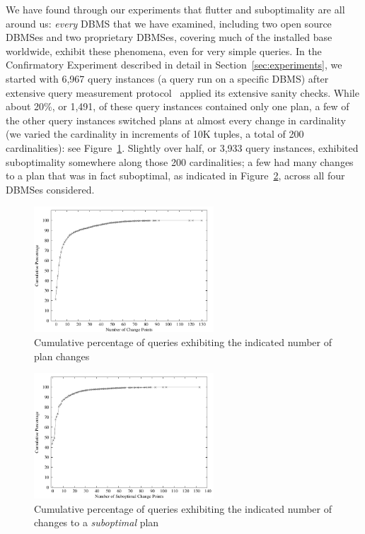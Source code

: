 \documentclass[prodmode,acmtods]{acmsmall}
\begin{document}
We have found through our experiments that flutter and suboptimality are all
around us: {\em every} \hbox{DBMS} that we have examined, including two
open source \hbox{DBMSes} and two proprietary
\hbox{DBMSes}, covering much of the installed base worldwide, exhibit these
phenomena, even for very simple queries. In the Confirmatory
Experiment described in detail in Section~\ref{sec:experiments}, we started
with 6,967 query instances (a query run on a specific \hbox{DBMS}) after  extensive query measurement
protocol~\cite{TTPv1,TTPv2} applied its extensive sanity checks. While about
20\%, or 1,491, of these query instances contained only one
plan, a few of the other query instances switched plans at almost every change in cardinality (we varied the
cardinality in increments of 10K tuples, a total of 200 cardinalities): see
Figure~\ref{fig:planchanges}. Slightly over half, or 3,933 query instances, exhibited
suboptimality somewhere along those 200 cardinalities; a few had
many changes to a plan that was in fact suboptimal, as indicated in
Figure~\ref{fig:suboptplanchanges}, across all four \hbox{DBMSes} considered.

\begin{figure}[t]\centering
\includegraphics[width=0.60\textwidth]{figures/org_ncpq.pdf}
\caption{Cumulative percentage of queries \hbox{exhibiting} the \hbox{indicated}
  number of plan changes\label{fig:planchanges}}
\end{figure}

\begin{figure}[t]\centering
\includegraphics[width=0.60\textwidth]{figures/zi_ncpq.pdf}
\caption{Cumulative percentage of queries exhibiting the \hbox{indicated}
  number of changes to a {\em suboptimal} plan\label{fig:suboptplanchanges}}
\vspace*{-2ex}
\end{figure}
\end{document}
